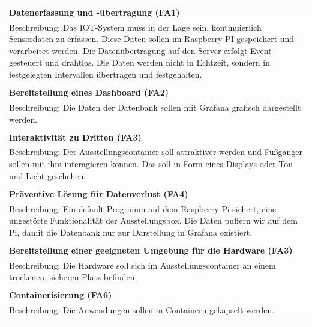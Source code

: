 \documentclass[
]{article}
\begin{document}
\begin{center}
  \begin{tabular}{|p{\linewidth}|}
    \hline
    \textbf{Datenerfassung und -übertragung (FA1)} \\
    Beschreibung: Das IOT-System muss in der Lage sein, kontinuierlich Sensordaten zu erfassen.
    Diese Daten sollen im Raspberry PI gespeichert und verarbeitet werden.
    Die Datenübertragung auf den Server erfolgt Event-gesteuert und drahtlos.
    Die Daten werden nicht in Echtzeit, sondern in festgelegten Intervallen übertragen und festgehalten. \\ \\
    \hline
    \textbf{Bereitstellung eines Dashboard (FA2)} \\
    Beschreibung: Die Daten der Datenbank sollen mit Grafana grafisch dargestellt werden.\\ \\
    \hline
    \textbf{Interaktivität zu Dritten (FA3)} \\
    Beschreibung: Der Ausstellungscontainer soll attraktiver werden und Fußgänger sollen mit ihm interagieren können.
    Das soll in Form eines Displays oder Ton und Licht geschehen. \\ \\
    \hline
    \textbf{Präventive Lösung für Datenverlust (FA4)} \\
    Beschreibung: Ein default-Programm auf dem Raspberry Pi sichert, eine ungestörte Funktionalität der Ausstellungsbox.
    Die Daten puffern wir auf dem Pi, damit die Datenbank nur zur Darstellung in Grafana existiert.\\ \\
    \hline
    \textbf{Bereitstellung einer geeigneten Umgebung für die Hardware (FA3)} \\
    Beschreibung: Die Hardware soll sich im Ausstellungscontainer an einem trockenen, sicheren Platz befinden.\\ \\
    \hline
    \textbf{Containerisierung (FA6)} \\
    Beschreibung: Die Anwendungen sollen in Containern gekapselt werden. \\ \\
    \hline
  \end{tabular}
\end{center}
\end{document}
